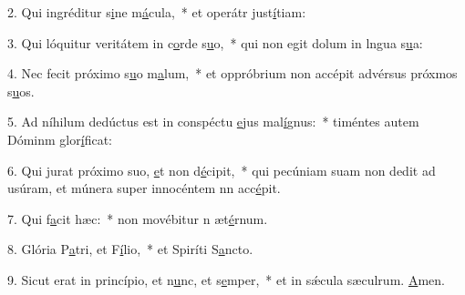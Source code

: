 2. Qui ingréditur s\uline{i}ne m\uline{á}cula,~* et operátr just\uline{í}tiam:\par 
3. Qui lóquitur veritátem in c\uline{o}rde s\uline{u}o,~* qui non egit dolum in lngua s\uline{u}a:\par 
4. Nec fecit próximo s\uline{u}o m\uline{a}lum,~* et oppróbrium non accépit advérsus próxmos s\uline{u}os.\par 
5. Ad níhilum dedúctus est in conspéctu \uline{e}jus mal\uline{í}gnus:~* timéntes autem Dóminm glor\uline{í}ficat:\par 
6. Qui jurat próximo suo, \uline{e}t non d\uline{é}cipit,~* qui pecúniam suam non dedit ad usúram, et múnera super innocéntem nn acc\uline{é}pit.\par 
7. Qui f\uline{a}cit hæc:~* non movébitur n æt\uline{é}rnum.\par 
8. Glória P\uline{a}tri, et F\uline{í}lio,~* et Spiríti S\uline{a}ncto.\par 
9. Sicut erat in princípio, et n\uline{u}nc, et s\uline{e}mper,~* et in sǽcula sæculrum. \uline{A}men.\par 
